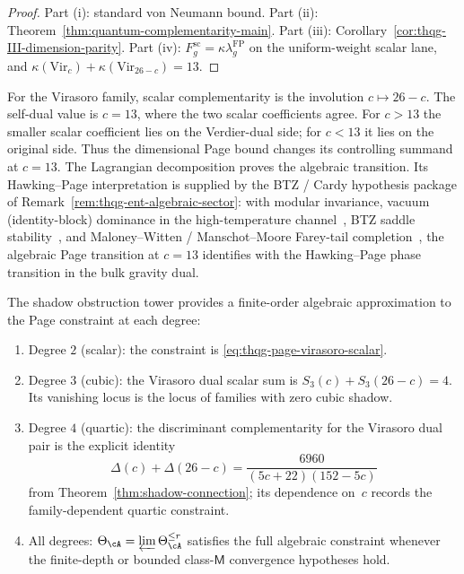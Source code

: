 \begin{proof}
Part (i): standard von Neumann bound.
Part (ii): Theorem~\ref{thm:quantum-complementarity-main}.
Part (iii): Corollary~\ref{cor:thqg-III-dimension-parity}.
Part (iv): $F_g^{\mathrm{sc}}=\kappa\lambda_g^{\mathrm{FP}}$ on the
uniform-weight scalar lane, and
$\kappa(\mathrm{Vir}_c) + \kappa(\mathrm{Vir}_{26-c}) = 13$.
\end{proof}

\begin{remark}
\label{rem:thqg-page-transition}
For the Virasoro family, scalar complementarity is the involution
$c\mapsto 26-c$.  The self-dual value is $c=13$, where the two scalar
coefficients agree.  For $c>13$ the smaller scalar coefficient lies on
the Verdier-dual side; for $c<13$ it lies on the original side.  Thus
the dimensional Page bound changes its controlling summand at
$c=13$.  The Lagrangian decomposition proves the algebraic transition.
Its Hawking--Page interpretation is supplied by the BTZ / Cardy
hypothesis package of
Remark~\ref{rem:thqg-ent-algebraic-sector}: with modular invariance,
vacuum (identity-block) dominance in the high-temperature
channel~\cite{Cardy86}, BTZ saddle stability~\cite{BTZ92}, and
Maloney--Witten / Manschot--Moore Farey-tail
completion~\cite{Maloney-Witten07}, the algebraic Page transition at
$c=13$ identifies
with the Hawking--Page phase transition in the bulk gravity dual.
\end{remark}

\begin{remark}
\label{rem:thqg-page-constructive}
The shadow obstruction tower provides a finite-order algebraic
approximation to the Page constraint at each degree:
\begin{enumerate}[label=\textup{(\arabic*)}]
\item Degree $2$ (scalar): the constraint is
 \eqref{eq:thqg-page-virasoro-scalar}.
\item Degree $3$ (cubic): the Virasoro dual scalar sum is
 $S_3(c)+S_3(26-c)=4$.  Its vanishing locus is the locus of
 families with zero cubic shadow.
\item Degree $4$ (quartic): the discriminant complementarity
 for the Virasoro dual pair is the explicit identity
 \[
 \Delta(c)+\Delta(26-c)
 =
 \frac{6960}{(5c+22)(152-5c)}
 \]
 from Theorem~\ref{thm:shadow-connection}; its dependence on~$c$
 records the family-dependent quartic constraint.
\item All degrees: $\Theta_\cA = \varprojlim \Theta_\cA^{\le r}$
 satisfies the full algebraic constraint whenever the finite-depth or
 bounded class-$\mathsf M$ convergence hypotheses hold.
\end{enumerate}
\end{remark}

